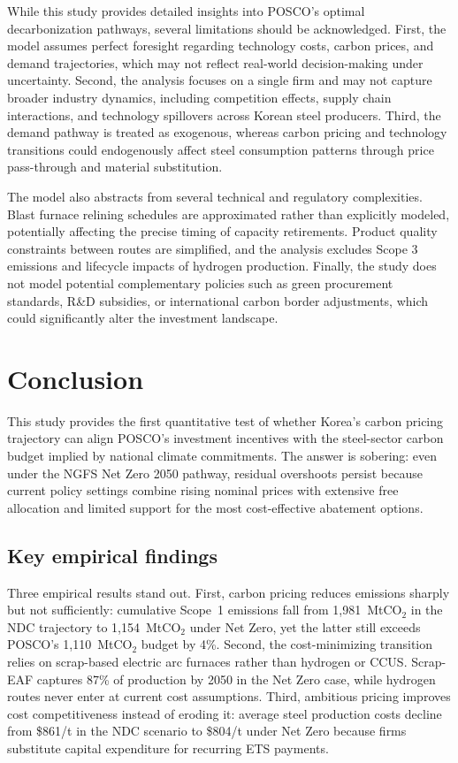 \documentclass[preprint,1p,authoryear]{elsarticle}
\begin{document}
While this study provides detailed insights into POSCO's optimal decarbonization pathways, several limitations should be acknowledged. First, the model assumes perfect foresight regarding technology costs, carbon prices, and demand trajectories, which may not reflect real-world decision-making under uncertainty. Second, the analysis focuses on a single firm and may not capture broader industry dynamics, including competition effects, supply chain interactions, and technology spillovers across Korean steel producers. Third, the demand pathway is treated as exogenous, whereas carbon pricing and technology transitions could endogenously affect steel consumption patterns through price pass-through and material substitution.

The model also abstracts from several technical and regulatory complexities. Blast furnace relining schedules are approximated rather than explicitly modeled, potentially affecting the precise timing of capacity retirements. Product quality constraints between routes are simplified, and the analysis excludes Scope 3 emissions and lifecycle impacts of hydrogen production. Finally, the study does not model potential complementary policies such as green procurement standards, R\&D subsidies, or international carbon border adjustments, which could significantly alter the investment landscape.

\section{Conclusion}

This study provides the first quantitative test of whether Korea's carbon pricing trajectory can align POSCO's investment incentives with the steel-sector carbon budget implied by national climate commitments. The answer is sobering: even under the NGFS Net Zero 2050 pathway, residual overshoots persist because current policy settings combine rising nominal prices with extensive free allocation and limited support for the most cost-effective abatement options.

\subsection{Key empirical findings}

Three empirical results stand out. First, carbon pricing reduces emissions sharply but not sufficiently: cumulative Scope~1 emissions fall from 1{,}981~MtCO$_2$ in the NDC trajectory to 1{,}154~MtCO$_2$ under Net Zero, yet the latter still exceeds POSCO's 1{,}110~MtCO$_2$ budget by 4\%. Second, the cost-minimizing transition relies on scrap-based electric arc furnaces rather than hydrogen or CCUS. Scrap-EAF captures 87\% of production by 2050 in the Net Zero case, while hydrogen routes never enter at current cost assumptions. Third, ambitious pricing improves cost competitiveness instead of eroding it: average steel production costs decline from \$861/t in the NDC scenario to \$804/t under Net Zero because firms substitute capital expenditure for recurring ETS payments.
\end{document}
